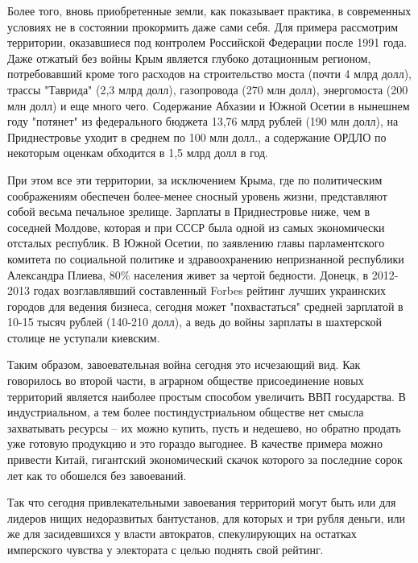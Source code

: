 Более того, вновь приобретенные земли, как показывает практика, в современных
условиях не в состоянии прокормить даже сами себя. Для примера рассмотрим
территории, оказавшиеся под контролем Российской Федерации после 1991 года.
Даже отжатый без войны Крым является глубоко дотационным регионом,
потребовавший кроме того расходов на строительство моста (почти 4 млрд долл),
трассы "Таврида" (2,3 млрд долл), газопровода (270 млн долл), энергомоста (200
млн долл) и еще много чего. Содержание Абхазии и Южной Осетии в нынешнем году
"потянет" из федерального бюджета 13,76 млрд рублей (190 млн долл), на
Приднестровье уходит в среднем по 100 млн долл., а содержание ОРДЛО по
некоторым оценкам обходится в 1,5 млрд долл в год.

При этом все эти территории, за исключением Крыма, где по политическим
соображениям обеспечен более-менее сносный уровень жизни, представляют собой
весьма печальное зрелище. Зарплаты в Приднестровье ниже, чем в соседней
Молдове, которая и при СССР была одной из самых экономически отсталых
республик. В Южной Осетии, по заявлению главы парламентского комитета по
социальной политике и здравоохранению непризнанной республики Александра
Плиева, 80\% населения живет за чертой бедности. Донецк, в 2012-2013 годах
возглавлявший составленный Forbes рейтинг лучших украинских городов для ведения
бизнеса, сегодня может "похвастаться" средней зарплатой в 10-15 тысяч рублей
(140-210 долл), а ведь до войны зарплаты в шахтерской столице не уступали
киевским.

Таким образом, завоевательная война сегодня это исчезающий вид. Как говорилось
во второй части, в аграрном обществе присоединение новых территорий является
наиболее простым способом увеличить ВВП государства. В индустриальном, а тем
более постиндустриальном обществе нет смысла захватывать ресурсы – их можно
купить, пусть и недешево, но обратно продать уже готовую продукцию и это
гораздо выгоднее. В качестве примера можно привести Китай, гигантский
экономический скачок которого за последние сорок лет как то обошелся без
завоеваний. 

Так что сегодня привлекательными завоевания территорий могут быть или для
лидеров нищих недоразвитых бантустанов, для которых и три рубля деньги, или же
для засидевшихся у власти автократов, спекулирующих на остатках имперского
чувства у электората с целью поднять свой рейтинг.

